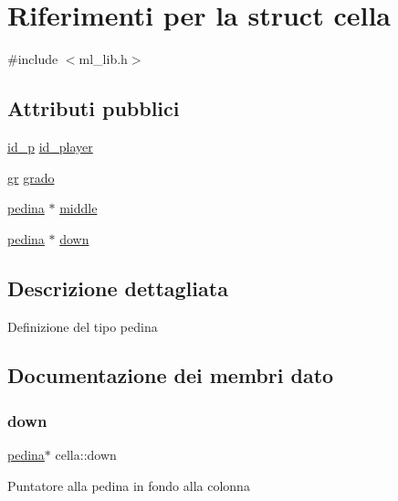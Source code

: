\hypertarget{structcella}{}\section{Riferimenti per la struct cella}
\label{structcella}


{\ttfamily \#include $<$ml\+\_\+lib.\+h$>$}

\subsection*{Attributi pubblici}
\begin{DoxyCompactItemize}
\item 
\hyperlink{ml__lib_8h_a0330ff92cbc796e96c3ce3e4401bf1e1}{id\+\_\+p} \hyperlink{structcella_a7cf7cebae17473f8d52d515a2a400dfe}{id\+\_\+player}
\item 
\hyperlink{ml__lib_8h_a25f6e8adc446355e3f42092ecf9d598c}{gr} \hyperlink{structcella_a79404d480b96b227ce1fca8cfca5ea66}{grado}
\item 
\hyperlink{ml__lib_8h_a71fee95122b31f5cb0b07d9c16ffa3a5}{pedina} $\ast$ \hyperlink{structcella_aee3fa6fae5c1685708b80a7dca8fafd7}{middle}
\item 
\hyperlink{ml__lib_8h_a71fee95122b31f5cb0b07d9c16ffa3a5}{pedina} $\ast$ \hyperlink{structcella_a91897ce70af7b66dfca5de2141a8718d}{down}
\end{DoxyCompactItemize}


\subsection{Descrizione dettagliata}
Definizione del tipo pedina 

\subsection{Documentazione dei membri dato}
\mbox{\label{structcella_a91897ce70af7b66dfca5de2141a8718d}} 
\subsubsection{\texorpdfstring{down}{down}}
{\footnotesize\ttfamily \hyperlink{ml__lib_8h_a71fee95122b31f5cb0b07d9c16ffa3a5}{pedina}$\ast$ cella\+::down}

Puntatore alla pedina in fondo alla colonna \mbox{\label{structcella_a79404d480b96b227ce1fca8cfca5ea66}} 
